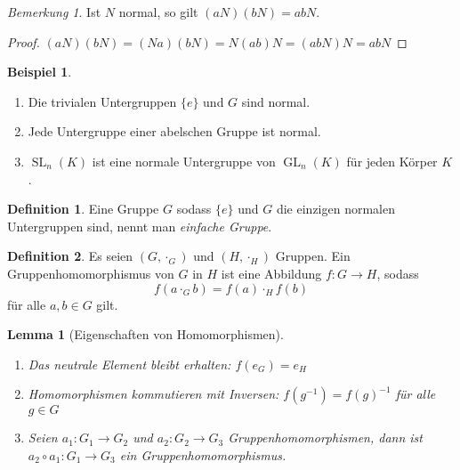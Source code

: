 \documentclass[12pt]{scrartcl} %
\DeclareMathOperator{\GL}{GL}
\DeclareMathOperator{\SL}{SL}
\newtheorem{lemma}[thm]{Lemma}
\theoremstyle{definition}
\newtheorem*{defn}{Definition}
\newtheorem{ex}{Beispiel}
\theoremstyle{remark}
\newtheorem*{nb}{Bemerkung}
\newcommand{\defi}{\emph}
\begin{document}
\begin{nb}
	Ist $N$ normal, so gilt $(aN)(bN)=abN$.
\end{nb}

\begin{proof}
	$(aN)(bN)=(Na)(bN)=N(ab)N=(abN)N=abN$
\end{proof}

\begin{ex}
	\begin{enumerate}
	\item Die trivialen Untergruppen $\{e\}$ und $G$ sind normal.
	\item Jede Untergruppe einer abelschen Gruppe ist normal.
	\item $\SL_n(K)$ ist eine normale Untergruppe von $\GL_n(K)$ für jeden Körper $K$.
	\end{enumerate}
\end{ex}

\begin{defn}
	Eine Gruppe $G$ sodass $\{e\}$ und $G$ die einzigen normalen Untergruppen sind, nennt man \defi{einfache Gruppe}.
\end{defn}

\begin{defn}
	Es seien $(G,\cdot_G)$ und $(H,\cdot_H)$ Gruppen.
	Ein Gruppenhomomorphismus von $G$ in $H$ ist eine Abbildung $f:G\rightarrow H$, sodass	$$f(a\cdot_{G}b)=f(a)\cdot_{H}f(b)$$ für alle $a,b\in G$ gilt.
\end{defn}

\begin{lemma}[Eigenschaften von Homomorphismen]
	\begin{enumerate}
	\item Das neutrale Element bleibt erhalten: $f(e_G)=e_H$
	\item Homomorphismen kommutieren mit Inversen: $f(g^{-1})=f(g)^{-1}$ für alle $g\in G$
	\item Seien $a_1: G_1\rightarrow G_2$ und $a_2: G_2\rightarrow G_3$ Gruppenhomomorphismen, dann ist $a_2\circ a_1: G_1\rightarrow G_3$ ein Gruppenhomomorphismus.
	\end{enumerate}
\end{lemma}
\end{document}
